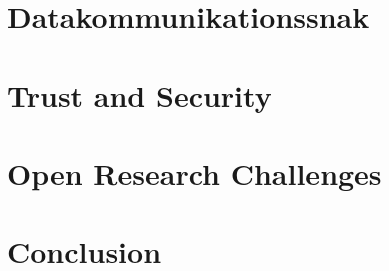 \documentclass[12pt,a4paper]{article}
\begin{document}
\section{Datakommunikationssnak}

\section{Trust and Security}

\section{Open Research Challenges}

\section{Conclusion}

\newpage


\label{bib:mybiblio}
\end{document}
